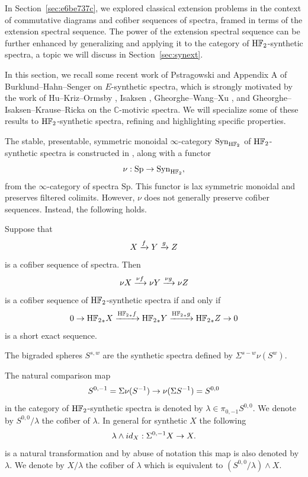\documentclass{amsart}
\numberwithin{equation}{section}
\newcommand{\HF}{\mathrm{H}\bF_2}
\begin{document}
%
%
%

%
%
%

%
%
%

%
%
%
%

In Section~\ref{sec:e6be737c}, we explored classical extension problems in the context of commutative diagrams and cofiber sequences of spectra, framed in terms of the extension spectral sequence. The power of the extension spectral sequence can be further enhanced by generalizing and applying it to the category of $\HF$-synthetic spectra, a topic we will discuss in Section~\ref{sec:synext}.

In this section, we recall some recent work of Pstragowski \cite{Pst} and Appendix A of Burklund--Hahn--Senger \cite{BHS} on $E$-synthetic spectra, which is strongly motivated by the work of Hu--Kriz--Ormsby \cite{HuKrizOrmsby}, Isaksen \cite{Isaksen}, Gheorghe--Wang--Xu \cite{GWX}, and Gheorghe--Isaksen--Krause--Ricka \cite{GIKR} on the $\mathbb{C}$-motivic spectra. We will specialize some of these results to $\HF$-synthetic spectra, refining and highlighting specific properties.

The stable, presentable, symmetric monoidal $\infty$-category $\mathrm{Syn}_{\HF}$ of $\HF$-synthetic spectra is constructed in \cite{Pst}, along with a functor
$$\nu: \mathrm{Sp}\to \mathrm{Syn}_{\HF},$$
from the $\infty$-category of spectra $\mathrm{Sp}$. This functor is lax symmetric monoidal and preserves filtered colimits. However, $\nu$ does not generally preserve cofiber sequences. Instead, the following holds.

\begin{proposition}\label{prop:1f7950df}
    Suppose that
    $$X\xrightarrow{f} Y\xrightarrow{g} Z$$
    is a cofiber sequence of spectra. Then
    $$\nu X\xrightarrow{\nu f}\nu Y\xrightarrow{\nu g} \nu Z$$
    is a cofiber sequence of ${\HF}$-synthetic spectra if and only if
    $$0\to {\HF}_*X\fto{{\HF}_*f} {\HF}_*Y\fto{{\HF}_*g} {\HF}_*Z\to 0$$
    is a short exact sequence.
\end{proposition}


\begin{definition}
The bigraded spheres $S^{s,w}$ are the synthetic spectra defined by $\Sigma^{s-w}\nu (S^w)$.
\end{definition}

\begin{definition}
    The natural comparison map
    $$S^{0,-1}=\Sigma \nu (S^{-1})\to \nu(\Sigma S^{-1})=S^{0,0}$$
    in the category of $\HF$-synthetic spectra is denoted by $\lambda\in \pi_{0,-1}S^{0,0}$. We denote by $S^{0,0}/\lambda$ the cofiber of $\lambda$. In general for synthetic $X$ the following
    $$\lambda\wedge id_X: \Sigma^{0,-1}X\to X.$$
    is a natural transformation and by abuse of notation this map is also denoted by $\lambda$.
    We denote by $X/\lambda$ the cofiber of $\lambda$
    which is equivalent to $(S^{0,0}/\lambda) \wedge X$.
\end{definition}
\end{document}
